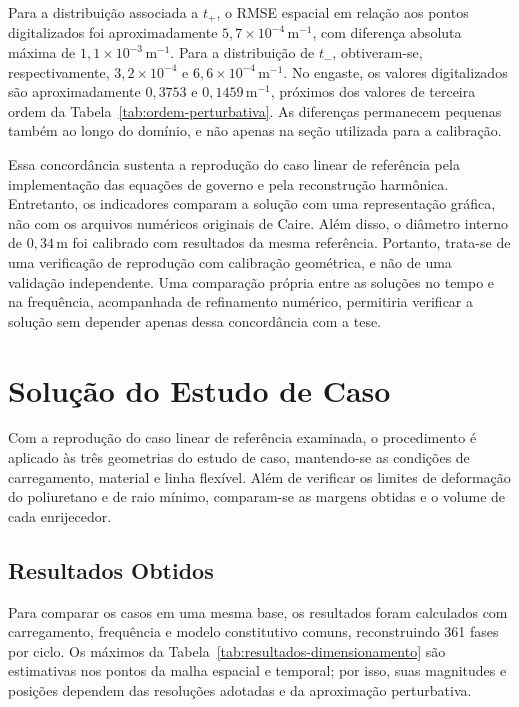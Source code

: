 \documentclass[arial,centeredequations,english,brazilian,oneside,section=TITLE]{ifes8}
\begin{document}
Para a distribuição associada a $t_+$, o RMSE espacial em relação aos
pontos digitalizados foi aproximadamente
$5{,}7\times10^{-4}\,\mathrm{m^{-1}}$, com diferença absoluta máxima de
$1{,}1\times10^{-3}\,\mathrm{m^{-1}}$. Para a distribuição de $t_-$,
obtiveram-se, respectivamente, $3{,}2\times10^{-4}$ e
$6{,}6\times10^{-4}\,\mathrm{m^{-1}}$. No engaste, os valores
digitalizados são aproximadamente $0{,}3753$ e
$0{,}1459\,\mathrm{m^{-1}}$, próximos dos valores de terceira ordem
da Tabela~\ref{tab:ordem-perturbativa}. As diferenças permanecem pequenas
também ao longo do domínio, e não apenas na seção utilizada para a
calibração.

Essa concordância sustenta a reprodução do caso linear de referência
pela implementação das equações de governo e pela reconstrução harmônica.
Entretanto, os indicadores comparam a solução com uma representação
gráfica, não com os arquivos numéricos originais de Caire. Além disso,
o diâmetro interno de $0{,}34\,\mathrm{m}$ foi calibrado com resultados
da mesma referência. Portanto, trata-se de uma verificação de reprodução
com calibração geométrica, e não de uma validação independente.
Uma comparação própria entre as soluções no tempo e na frequência,
acompanhada de refinamento numérico, permitiria verificar a solução sem
depender apenas dessa concordância com a tese.

\section{Solução do Estudo de Caso}
\label{sec:solucao-do-estudo-de-caso}

Com a reprodução do caso linear de referência examinada, o procedimento é aplicado às três
geometrias do estudo de caso, mantendo-se as condições de carregamento,
material e linha flexível. Além de verificar os limites de deformação do
poliuretano e de raio mínimo, comparam-se as margens obtidas e o volume de
cada enrijecedor.

\subsection{Resultados Obtidos}
\label{sec:resultados-obtidos}

Para comparar os casos em uma mesma base, os resultados foram calculados
com carregamento, frequência e modelo constitutivo comuns, reconstruindo
361 fases por ciclo. Os máximos da
Tabela~\ref{tab:resultados-dimensionamento} são estimativas nos pontos da
malha espacial e temporal; por isso, suas magnitudes e posições dependem
das resoluções adotadas e da aproximação perturbativa.
\end{document}
